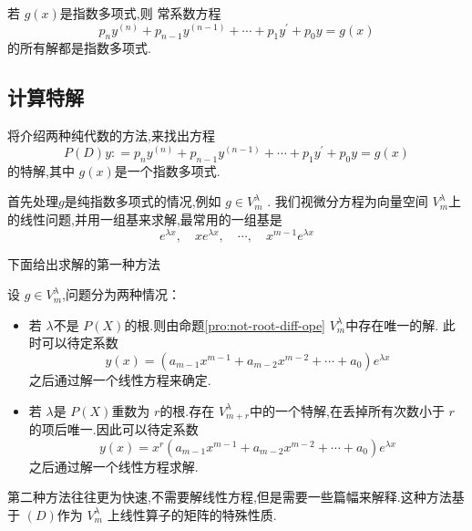 \documentclass[lang=cn,12pt,color=green,fontset=none]{elegantbook}
\begin{document}
\begin{proposition}
    若 \(  g\left( x \right)   \)是指数多项式,则 常系数方程 \[
    p_{n}y^{\left( n \right) }+ p_{n-1}y^{\left( n-1 \right) }+ \cdots + p_1y^{\prime} + p_0y=g\left( x \right) 
    \]的所有解都是指数多项式.
\end{proposition}

\subsection{计算特解}

将介绍两种纯代数的方法,来找出方程 \[
P\left( D \right)y : = p_{n}y^{\left( n \right) }+ p_{n-1}y^{\left( n-1 \right) }+ \cdots + p_1y^{\prime} + p_0y=g\left( x \right)  
\]的特解,其中 \(  g\left( x \right)   \)是一个指数多项式. 

首先处理\(   g  \)是纯指数多项式的情况,例如 \(  g \in V_{m}^{\lambda}  \)  .
我们视微分方程为向量空间 \(  V_{m}^{\lambda}  \)上的线性问题,并用一组基来求解,最常用的一组基是 \[
e^{\lambda x},\quad xe^{\lambda x},\quad \cdots , \quad x^{m-1}e^{\lambda x}
\] 

下面给出求解的第一种方法



设 \(  g \in V_{m}^{\lambda}  \),问题分为两种情况：
\begin{itemize}
    \item 若 \(  \lambda  \)不是 \(  P\left( X \right)   \)的根.则由命题\ref{pro:not-root-diff-ope} \(  V_{m}^{\lambda}  \)中存在唯一的解. 此时可以待定系数 \[
    y\left( x \right) = \left( a_{m-1}x^{m-1}+ a_{m-2}x^{m-2}+ \cdots + a_0 \right)e^{\lambda x}  
    \]之后通过解一个线性方程来确定.
    \item 若 \(  \lambda  \)是 \(  P\left( X \right)   \)重数为 \(  r  \)的根.存在 \(  V_{m+ r}^{\lambda}  \)中的一个特解,在丢掉所有次数小于 \(  r  \)的项后唯一.因此可以待定系数 \[
    y\left( x \right)=x^{r}\left( a_{m-1}x^{m-1}+ a_{m-2}x^{m-2}+ \cdots + a_0 \right)e^{\lambda x}  
    \]  之后通过解一个线性方程求解.
\end{itemize}


\hspace*{\fill}

第二种方法往往更为快速,不需要解线性方程,但是需要一些篇幅来解释.这种方法基于 \(  \left( D \right)   \)作为 \(  V_{m}^{\lambda}  \)  上线性算子的矩阵的特殊性质.
\end{document}
